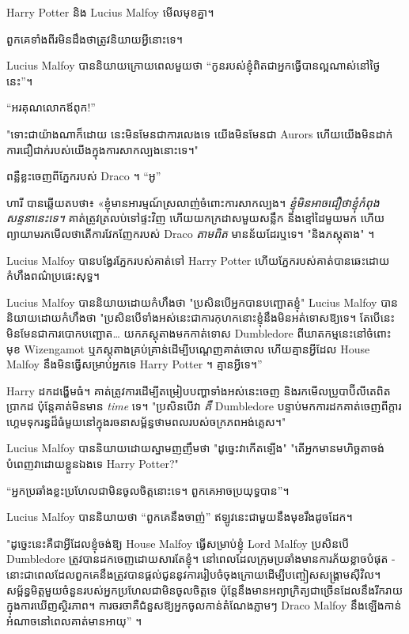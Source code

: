 {{{Harry Potter និង Lucius Malfoy មើលមុខគ្នា។

ពួកគេទាំងពីរមិនដឹងថាត្រូវនិយាយអ្វីនោះទេ។

Lucius Malfoy បាន​និយាយ​ក្រោយ​ពេល​មួយ​ថា “កូន​របស់​ខ្ញុំ​ពិត​ជា​អ្នក​ធ្វើ​បាន​ល្អ​ណាស់​នៅ​ថ្ងៃ​នេះ”។

“អរគុណលោកឪពុក!”

"ទោះជាយ៉ាងណាក៏ដោយ នេះមិនមែនជាការលេងទេ យើងមិនមែនជា Aurors ហើយយើងមិនដាក់ការជឿជាក់របស់យើងក្នុងការសាកល្បងនោះទេ។"

ពន្លឺខ្លះចេញពីភ្នែករបស់ Draco ។ “អូ”

ហារី បាន​ឆ្លើយ​តប​ថា​៖ «​ខ្ញុំ​មាន​អារម្មណ៍​ស្រលាញ់​ចំពោះ​ការ​សាកល្បង។ \emph{ខ្ញុំមិនអាចជឿថាខ្ញុំកំពុងសន្ទនានេះទេ។} គាត់ត្រូវត្រលប់ទៅផ្ទះវិញ ហើយយកក្រដាសមួយសន្លឹក និងខ្មៅដៃមួយមក ហើយព្យាយាមរកមើលថាតើការវែកញែករបស់ Draco \emph{តាមពិត} មានន័យដែរឬទេ។ "និងភស្តុតាង" ។

Lucius Malfoy បានបង្វែរភ្នែករបស់គាត់ទៅ Harry Potter ហើយភ្នែករបស់គាត់បានឆេះដោយកំហឹងពណ៌ប្រផេះសុទ្ធ។

Lucius Malfoy បាននិយាយដោយកំហឹងថា "ប្រសិនបើអ្នកបានបញ្ឆោតខ្ញុំ" Lucius Malfoy បាននិយាយដោយកំហឹងថា "ប្រសិនបើទាំងអស់នេះជាការកុហកនោះខ្ញុំនឹងមិនអត់ទោសឱ្យទេ។ តែ​បើ​នេះ​មិន​មែន​ជា​ការ​បោក​បញ្ឆោត… យកភស្តុតាងមកកាត់ទោស Dumbledore ពីឃាតកម្មនេះនៅចំពោះមុខ Wizengamot ឬភស្តុតាងគ្រប់គ្រាន់ដើម្បីបណ្តេញគាត់ចោល ហើយគ្មានអ្វីដែល House Malfoy នឹងមិនធ្វើសម្រាប់អ្នកទេ Harry Potter ។ គ្មានអ្វីទេ។”

Harry ដកដង្ហើមធំ។ គាត់​ត្រូវ​ការ​ដើម្បី​តម្រៀប​បញ្ហា​ទាំង​អស់​នេះ​ចេញ និង​រក​មើល​ប្រូបាប៊ីលីតេ​ពិត​ប្រាកដ ប៉ុន្តែ​គាត់​មិន​មាន \emph{time} ទេ។ "ប្រសិនបើវា \emph{គឺ} Dumbledore បន្ទាប់មកការដកគាត់ចេញពីក្តារហ្គេមទុករន្ធដ៏ធំមួយនៅក្នុងរចនាសម្ព័ន្ធថាមពលរបស់ចក្រភពអង់គ្លេស។"

Lucius Malfoy បាននិយាយដោយស្នាមញញឹមថា "ដូច្នេះវាកើតឡើង" "តើអ្នកមានមហិច្ឆតាចង់បំពេញវាដោយខ្លួនឯងទេ Harry Potter?"

“អ្នកប្រឆាំងខ្លះប្រហែលជាមិនចូលចិត្តនោះទេ។ ពួកគេអាចប្រយុទ្ធបាន”។

Lucius Malfoy បាននិយាយថា “ពួកគេនឹងចាញ់” ឥឡូវនេះជាមួយនឹងមុខរឹងដូចដែក។

"ដូច្នេះនេះគឺជាអ្វីដែលខ្ញុំចង់ឱ្យ House Malfoy ធ្វើសម្រាប់ខ្ញុំ Lord Malfoy ប្រសិនបើ Dumbledore ត្រូវបានដកចេញដោយសារតែខ្ញុំ។ នៅពេលដែលក្រុមប្រឆាំងមានការភ័យខ្លាចបំផុត - នោះជាពេលដែលពួកគេនឹងត្រូវបានផ្តល់ជូននូវការរៀបចំចុងក្រោយដើម្បីបញ្ចៀសសង្គ្រាមស៊ីវិល។ សម្ព័ន្ធមិត្តមួយចំនួនរបស់អ្នកប្រហែលជាមិនចូលចិត្តទេ ប៉ុន្តែនឹងមានអព្យាក្រិត្យជាច្រើនដែលនឹងរីករាយក្នុងការឃើញស្ថិរភាព។ ការចរចាគឺជំនួសឱ្យអ្នកចូលកាន់តំណែងភ្លាមៗ Draco Malfoy នឹងឡើងកាន់អំណាចនៅពេលគាត់មានអាយុ” ។

}}}
